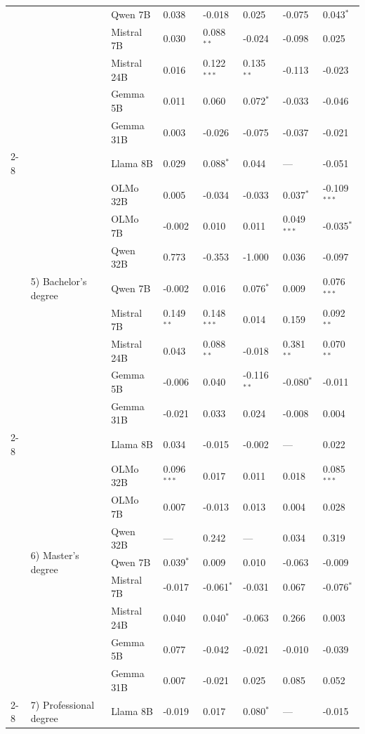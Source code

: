 \begin{longtable}[t]{llllllll}
 &  & Qwen 7B & 0.038 & -0.018 & 0.025 & -0.075 & 0.043$^{*}$ \\
 &  & Mistral 7B & 0.030 & 0.088$^{**}$ & -0.024 & -0.098 & 0.025 \\
 &  & Mistral 24B & 0.016 & 0.122$^{***}$ & 0.135$^{**}$ & -0.113 & -0.023 \\
 &  & Gemma 5B & 0.011 & 0.060 & 0.072$^{*}$ & -0.033 & -0.046 \\
 &  & Gemma 31B & 0.003 & -0.026 & -0.075 & -0.037 & -0.021 \\
\cline{2-8}
 & \multirow[t]{9}{*}{5) Bachelor's degree} & Llama 8B & 0.029 & 0.088$^{*}$ & 0.044 & --- & -0.051 \\
 &  & OLMo 32B & 0.005 & -0.034 & -0.033 & 0.037$^{*}$ & -0.109$^{***}$ \\
 &  & OLMo 7B & -0.002 & 0.010 & 0.011 & 0.049$^{***}$ & -0.035$^{*}$ \\
 &  & Qwen 32B & 0.773 & -0.353 & -1.000 & 0.036 & -0.097 \\
 &  & Qwen 7B & -0.002 & 0.016 & 0.076$^{*}$ & 0.009 & 0.076$^{***}$ \\
 &  & Mistral 7B & 0.149$^{**}$ & 0.148$^{***}$ & 0.014 & 0.159 & 0.092$^{**}$ \\
 &  & Mistral 24B & 0.043 & 0.088$^{**}$ & -0.018 & 0.381$^{**}$ & 0.070$^{**}$ \\
 &  & Gemma 5B & -0.006 & 0.040 & -0.116$^{**}$ & -0.080$^{*}$ & -0.011 \\
 &  & Gemma 31B & -0.021 & 0.033 & 0.024 & -0.008 & 0.004 \\
\cline{2-8}
 & \multirow[t]{9}{*}{6) Master's degree} & Llama 8B & 0.034 & -0.015 & -0.002 & --- & 0.022 \\
 &  & OLMo 32B & 0.096$^{***}$ & 0.017 & 0.011 & 0.018 & 0.085$^{***}$ \\
 &  & OLMo 7B & 0.007 & -0.013 & 0.013 & 0.004 & 0.028 \\
 &  & Qwen 32B & --- & 0.242 & --- & 0.034 & 0.319 \\
 &  & Qwen 7B & 0.039$^{*}$ & 0.009 & 0.010 & -0.063 & -0.009 \\
 &  & Mistral 7B & -0.017 & -0.061$^{*}$ & -0.031 & 0.067 & -0.076$^{*}$ \\
 &  & Mistral 24B & 0.040 & 0.040$^{*}$ & -0.063 & 0.266 & 0.003 \\
 &  & Gemma 5B & 0.077 & -0.042 & -0.021 & -0.010 & -0.039 \\
 &  & Gemma 31B & 0.007 & -0.021 & 0.025 & 0.085 & 0.052 \\
\cline{2-8}
 & \multirow[t]{9}{*}{7) Professional degree} & Llama 8B & -0.019 & 0.017 & 0.080$^{*}$ & --- & -0.015 \\

\end{longtable}
